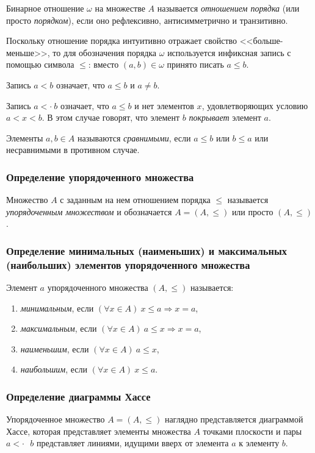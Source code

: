 \documentclass[bachelor, och, labwork]{shiza}
\begin{document}
Бинарное отношение $\omega$ на множестве $A$ называется \textit{отношением порядка}
(или просто \textit{порядком}), если оно рефлексивно, антисимметрично и транзитивно.

Поскольку отношение порядка интуитивно отражает свойство <<больше-меньше>>, то для
обозначения порядка $\omega$ используется инфиксная запись с помощью символа 
$\leq$: вместо $(a,b)\in \omega$ принято писать $a\leq b$.

Запись $a < b$ означает, что $a \le b$ и $a \not = b$.

Запись $a <\cdot ~b$ означает, что $a \le b$ и нет элементов $x$, удовлетворяющих
условию $a < x < b$. В этом случае говорят, что элемент $b$ \textit{покрывает} 
элемент $a$.

Элементы $a,b\in A$ называются \textit{сравнимыми}, если $a \le b$ или $b \le a$
или несравнимыми в противном случае.

\subsubsection{Определение упорядоченного множества}
Множество $A$ с заданным на нем отношением порядка $\le$ называется
\textit{упорядоченным множеством} и обозначается $A=(A,\le)$ или просто $(A,\le)$.

\subsubsection{Определение минимальных (наименьших) и максимальных (наибольших) элементов упорядоченного множества}

Элемент $a$ упорядоченного множества $(A,\le)$ называется:
\begin{enumerate}
    \item \textit{минимальным}, если $(\forall x \in A) ~x \le a \Rightarrow x = a$,
    \item \textit{максимальным}, если $(\forall x \in A) ~a \le x \Rightarrow x = a$,
    \item \textit{наименьшим}, если $(\forall x \in A) ~a \le x$,
    \item \textit{наибольшим}, если $(\forall x \in A) ~x \le a$.
\end{enumerate}


\subsubsection{Определение диаграммы Хассе}

Упорядоченное множество $A = (A, \leq)$ наглядно представляется диаграммой Хассе, 
которая представляет элементы множества $A$ точками плоскости и пары $a <\cdot \text{ } b$ 
представляет линиями, идущими вверх от элемента $a$ к элементу $b$.
\end{document}
